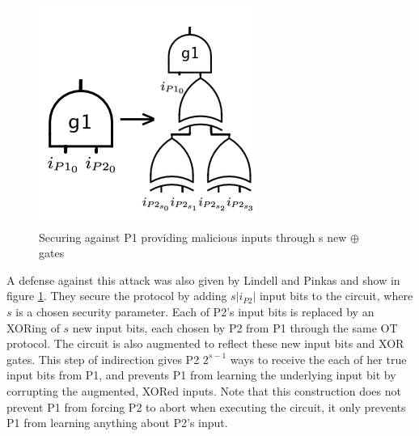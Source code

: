 \begin{figure}
    \centering
    \includegraphics[width=\columnwidth]{images/secureing_malicious_inputs}
    \caption{Securing against \ac{P1} providing malicious inputs through s new $\oplus$ gates}
    \label{fig:inputsecure}
\end{figure}

A defense against this attack was also given by Lindell and Pinkas\cite{lindell2007efficient} and show in figure \ref{fig:inputsecure}.  They secure the protocol by adding $s|i_{P2}|$ input bits to the circuit, where $s$ is a chosen security parameter.  Each of \ac{P2}'s input bits is replaced by an XORing of $s$ new input bits, each chosen by \ac{P2} from \ac{P1} through the same \ac{OT} protocol.  The circuit is also augmented to reflect these new input bits and XOR gates. This step of indirection gives \ac{P2} $2^{s-1}$ ways to receive the each of her true input bits from \ac{P1}, and prevents \ac{P1} from learning the underlying input bit by corrupting the augmented, XORed inputs.  Note that this construction does not prevent \ac{P1} from forcing \ac{P2} to abort when executing the circuit, it only prevents \ac{P1} from learning anything about \ac{P2}'s input.

